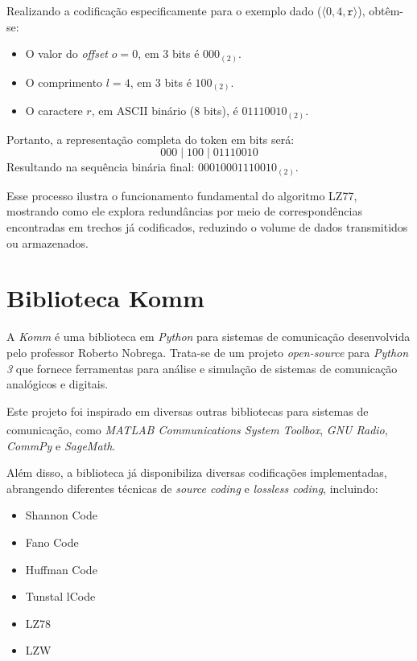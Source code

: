 Realizando a codificação especificamente para o exemplo dado ($\langle 0, 4,
  \texttt{r} \rangle$), obtêm-se:
\begin{itemize}
  \item O valor do \textit{offset} $o = 0$, em $3$ bits é $000_{(2)}$.
  \item O comprimento $l = 4$, em $3$ bits é $100_{(2)}$.
  \item O caractere $r$, em ASCII binário ($8$ bits), é $01110010_{(2)}$.
\end{itemize}
Portanto, a representação completa do token em bits será:
$$
  000 \;|\; 100 \;|\; 01110010
$$
Resultando na sequência binária final: $00010001110010_{(2)}$.

Esse processo ilustra o funcionamento fundamental do algoritmo LZ77, mostrando
como ele explora redundâncias por meio de correspondências encontradas em
trechos já codificados, reduzindo o volume de dados transmitidos ou
armazenados.

\newpage
\section{Biblioteca Komm}
A \textit{Komm} é uma biblioteca em \textit{Python} para sistemas de
comunicação desenvolvida pelo professor Roberto Nobrega. Trata-se de um projeto
\textit{open-source} para \textit{Python 3} que fornece ferramentas para
análise e simulação de sistemas de comunicação analógicos e digitais.

Este projeto foi inspirado em diversas outras bibliotecas para sistemas de
comunicação, como \textit{MATLAB\textsuperscript{\textregistered}
  Communications System Toolbox\texttrademark}, \textit{GNU Radio},
\textit{CommPy} e \textit{SageMath}.

Além disso, a biblioteca já disponibiliza diversas codificações implementadas,
abrangendo diferentes técnicas de \textit{source coding} e \textit{lossless
  coding}, incluindo:
\begin{itemize}
  \item {Shannon Code}
  \item {Fano Code}
  \item {Huffman Code}
  \item {Tunstal lCode}
  \item {LZ78}
  \item {LZW}
\end{itemize}

